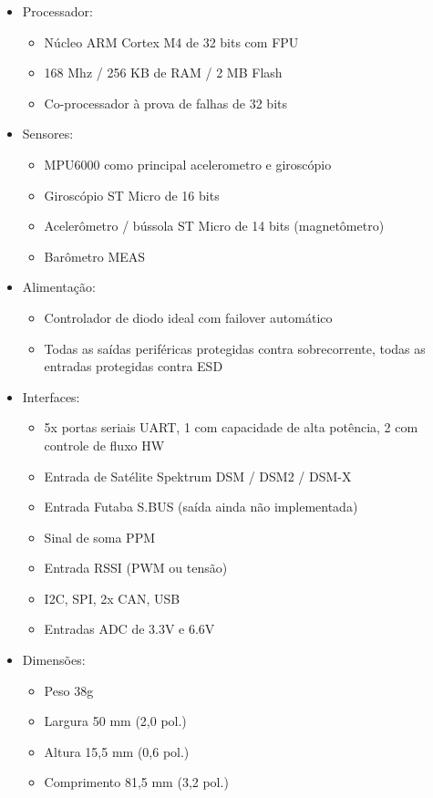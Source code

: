 \begin{itemize}

    \item Processador:
    \begin{itemize}
        \item Núcleo ARM Cortex M4 de 32 bits com FPU
        \item 168 Mhz / 256 KB de RAM / 2 MB Flash
        \item Co-processador à prova de falhas de 32 bits
        
    \end{itemize}
    
    \item Sensores:
    \begin{itemize}
        \item MPU6000 como principal acelerometro e giroscópio
        \item Giroscópio ST Micro de 16 bits
        \item Acelerômetro / bússola ST Micro de 14 bits (magnetômetro)
        \item Barômetro MEAS
    \end{itemize}
    
    \item Alimentação:
    \begin{itemize}
        \item Controlador de diodo ideal com failover automático
        \item Todas as saídas periféricas protegidas contra sobrecorrente, todas as entradas protegidas contra ESD
    \end{itemize}
    
    \item Interfaces:
    \begin{itemize}
        \item 5x portas seriais UART, 1 com capacidade de alta potência, 2 com controle de fluxo HW
        \item Entrada de Satélite Spektrum DSM / DSM2 / DSM-X
        \item Entrada Futaba S.BUS (saída ainda não implementada)
        \item Sinal de soma PPM
        \item Entrada RSSI (PWM ou tensão)
        \item I2C, SPI, 2x CAN, USB
        \item Entradas ADC de 3.3V e 6.6V
    \end{itemize}
    
    \item Dimensões:
    \begin{itemize}
        \item Peso 38g
        \item Largura 50 mm (2,0 pol.)
        \item Altura 15,5 mm (0,6 pol.)
        \item Comprimento 81,5 mm (3,2 pol.)
    \end{itemize}
     
\end{itemize}
